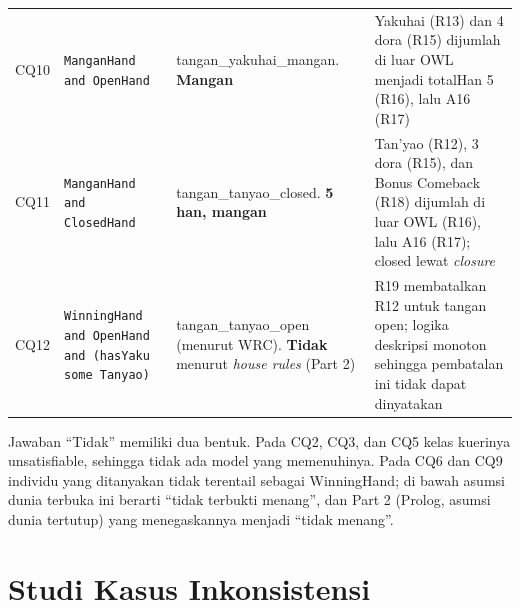 \documentclass[11pt,a4paper]{article}
\begin{document}
{\begin{longtable}{@{}p{0.9cm} p{4.1cm} p{4.0cm} p{5.0cm}@{}}
CQ10 & \texttt{ManganHand and OpenHand} & tangan\_yakuhai\_mangan. \textbf{Mangan} & Yakuhai (R13) dan 4 dora (R15) dijumlah di luar OWL menjadi totalHan 5 (R16), lalu A16 (R17) \\
CQ11 & \texttt{ManganHand and ClosedHand} & tangan\_tanyao\_closed. \textbf{5 han, mangan} & Tan'yao (R12), 3 dora (R15), dan Bonus Comeback (R18) dijumlah di luar OWL (R16), lalu A16 (R17); closed lewat \emph{closure} \\
CQ12 & \texttt{WinningHand and OpenHand and (hasYaku some Tanyao)} & tangan\_tanyao\_open (menurut WRC). \textbf{Tidak} menurut \emph{house rules} (Part 2) & R19 membatalkan R12 untuk tangan open; logika deskripsi monoton sehingga pembatalan ini tidak dapat dinyatakan \\
\midrule
\bottomrule
\end{longtable}
}

Jawaban ``Tidak'' memiliki dua bentuk. Pada CQ2, CQ3, dan CQ5 kelas kuerinya
unsatisfiable, sehingga tidak ada model yang memenuhinya. Pada CQ6 dan CQ9 individu
yang ditanyakan tidak terentail sebagai WinningHand; di bawah asumsi dunia terbuka ini
berarti ``tidak terbukti menang'', dan Part 2 (Prolog, asumsi dunia tertutup) yang
menegaskannya menjadi ``tidak menang''.

\section{Studi Kasus Inkonsistensi}
\end{document}
